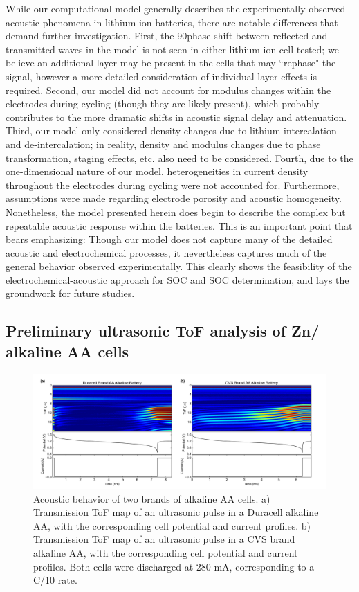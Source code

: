 While our computational model generally describes the experimentally observed acoustic phenomena in lithium-ion batteries, there are notable differences that demand further investigation. First, the 90\degree phase shift between reflected and transmitted waves in the model is not seen in either lithium-ion cell tested; we believe an additional layer may be present in the cells that may ``rephase" the signal, however a more detailed consideration of individual layer effects is required. Second, our model did not account for modulus changes within the electrodes during cycling (though they are likely present), which probably contributes to the more dramatic shifts in acoustic signal delay and attenuation. Third, our model only considered density changes due to lithium intercalation and de-intercalation; in reality, density and modulus changes due to phase transformation, staging effects, etc. also need to be considered. Fourth, due to the one-dimensional nature of our model, heterogeneities in current density throughout the electrodes during cycling were not accounted for. Furthermore, assumptions were made regarding electrode porosity and acoustic homogeneity. Nonetheless, the model presented herein does begin to describe the complex but repeatable acoustic response within the batteries. This is an important point that bears emphasizing: Though our model does not capture many of the detailed acoustic and electrochemical processes, it nevertheless captures much of the general behavior observed experimentally. This clearly shows the feasibility of the electrochemical-acoustic approach for SOC and SOC determination, and lays the groundwork for future studies.

\subsection{Preliminary ultrasonic ToF analysis of Zn/ alkaline AA cells}

\begin{figure}[htb]
  \centering
    \includegraphics[width=\textwidth]{ch4-bw/images/aacomp.png}
    \caption[Acoustic behavior of two brands of alkaline AA cells.]{Acoustic behavior of two brands of alkaline AA cells. a) Transmission ToF map of an ultrasonic pulse in a Duracell alkaline AA, with the corresponding cell potential and current profiles. b) Transmission ToF map of an ultrasonic pulse in a CVS brand alkaline AA, with the corresponding cell potential and current profiles. Both cells were discharged at 280 mA, corresponding to a C/10 rate.}
    \label{fig:aacomp}
\end{figure}

